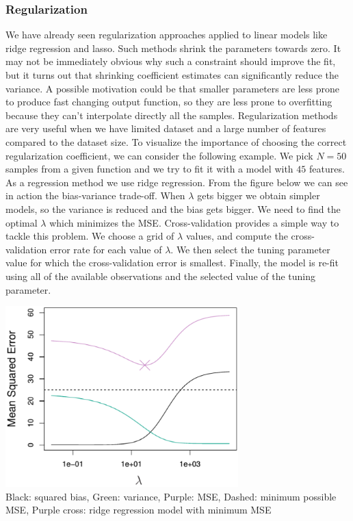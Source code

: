 \documentclass[main.tex]{subfiles}
\begin{document}
\newpage
\subsubsection{Regularization}
We have already seen regularization approaches applied to linear models like ridge regression and lasso. Such methods shrink the parameters towards zero. It may not be immediately obvious why such a constraint should improve the fit, but it turns out that shrinking coefficient estimates can significantly reduce the variance. A possible motivation could be that smaller parameters are less prone to produce fast changing output function, so they are less prone to overfitting because they can't interpolate directly all the samples. Regularization methods are very useful when we have limited dataset and a large number of features compared to the dataset size. To visualize the importance of choosing the correct regularization coefficient, we can consider the following example. We pick $N = 50$ samples from a given function and we try to fit it with a model with $45$ features. As a regression method we use ridge regression.
From the figure below we can see in action the bias-variance trade-off. When $\lambda$ gets bigger we obtain simpler models, so the variance is reduced and the bias gets bigger. We need to find the optimal $\lambda$ which minimizes the MSE. Cross-validation provides a simple way to tackle this problem. We choose a grid of $\lambda$ values, and compute the cross-validation error rate for each value of $\lambda$. We then select the tuning parameter value for which the cross-validation error is smallest. Finally, the model is re-fit using all of the available observations and the selected value of the tuning parameter.

\begin{center}
    \includegraphics[width=90mm]{img/Lasso_MSE_Lambda.PNG} \\
    Black: squared bias, Green: variance, Purple: MSE, Dashed: minimum possible MSE, Purple cross: ridge regression model with minimum MSE
\end{center}
\end{document}
